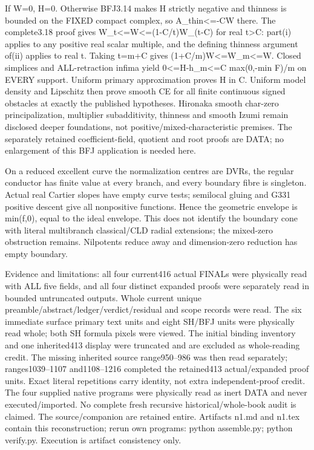 If W=0, H=0. Otherwise BFJ3.14 makes H strictly negative and thinness is bounded on the FIXED compact complex, so A\_thin\textless{}=-CW there. The complete3.18 proof gives W\_t\textless{}=W\textless{}=(1-C/t)W\_(t-C) for real t\textgreater{}C: part(i) applies to any positive real scalar multiple, and the defining thinness argument of(ii) applies to real t. Taking t=m+C gives (1+C/m)W\textless{}=W\_m\textless{}=W. Closed simplices and ALL-retraction infima yield 0\textless{}=H-h\_m\textless{}=C max(0,-min F)/m on EVERY support. Uniform primary approximation proves H in C. Uniform model density and Lipschitz then prove smooth CE for all finite continuous signed obstacles at exactly the published hypotheses. Hironaka smooth char-zero principalization, multiplier subadditivity, thinness and smooth Izumi remain disclosed deeper foundations, not positive/mixed-characteristic premises. The separately retained coefficient-field, quotient and root proofs are DATA; no enlargement of this BFJ application is needed here.

On a reduced excellent curve the normalization centres are DVRs, the regular conductor has finite value at every branch, and every boundary fibre is singleton. Actual real Cartier slopes have empty curve tests; semilocal gluing and G331 positive descent give all nonpositive functions. Hence the geometric envelope is min(f,0), equal to the ideal envelope. This does not identify the boundary cone with literal multibranch classical/CLD radial extensions; the mixed-zero obstruction remains. Nilpotents reduce away and dimension-zero reduction has empty boundary.

Evidence and limitations: all four current416 actual FINALs were physically read with ALL five fields, and all four distinct expanded proofs were separately read in bounded untruncated outputs. Whole current unique preamble/abstract/ledger/verdict/residual and scope records were read. The six immediate surface primary text units and eight SH/BFJ units were physically read whole; both SH formula pixels were viewed. The initial binding inventory and one inherited413 display were truncated and are excluded as whole-reading credit. The missing inherited source range950--986 was then read separately; ranges1039--1107 and1108--1216 completed the retained413 actual/expanded proof units. Exact literal repetitions carry identity, not extra independent-proof credit. The four supplied native programs were physically read as inert DATA and never executed/imported. No complete fresh recursive historical/whole-book audit is claimed. The source/companion are retained entire. Artifacts n1.md and n1.tex contain this reconstruction; rerun own programs: python assemble.py; python verify.py. Execution is artifact consistency only.

